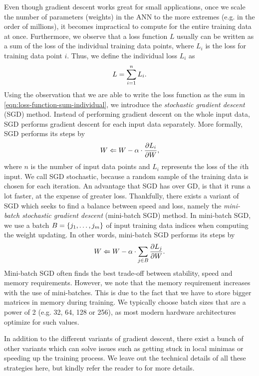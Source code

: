 Even though gradient descent works great for small applications, once we scale the number of parameters (weights) in the ANN to the more extremes (e.g. in the order of millions), it becomes impractical to compute for the entire training data at once. Furthermore, we observe that a loss function $L$ usually can be written as a sum of the loss of the individual training data points, where $L_i$ is the loss for training data point $i$. Thus, we define the individual loss $L_i$ as
\begin{align}
    \label{eqn:loss-function-sum-individual}
    L = \sum\limits_{i=1}^{n} L_i.
\end{align}
Using the observation that we are able to write the loss function as the sum in \cref{eqn:loss-function-sum-individual}, we introduce the \textit{stochastic gradient descent} (SGD) method. Instead of performing gradient descent on the whole input data, SGD performs gradient descent for each input data separately. More formally, SGD performs its steps by
\begin{align}
    \label{eqn:sgd}
    W \Leftarrow W - \alpha \cdot \frac{\partial L_i}{\partial W},
\end{align}
where $n$ is the number of input data points and $L_i$ represents the loss of the $i$th input. We call SGD stochastic, because a random sample of the training data is chosen for each iteration. An advantage that SGD has over GD, is that it runs a lot faster, at the expense of greater loss. Thankfully, there exists a variant of SGD which seeks to find a balance between speed and loss, namely the \textit{mini-batch stochastic gradient descent} (mini-batch SGD) method. In mini-batch SGD, we use a batch $B=\left\{j_1, \ldots, j_m\right\}$ of input training data indices when computing the weight updating. In other words, mini-batch SGD performs its steps by
\begin{align}
    \label{eqn:mbsgd}
    W \Leftarrow W - \alpha \cdot \sum\limits_{j \in B}^{} \frac{\partial L_j}{\partial W}.
\end{align}
Mini-batch SGD often finds the best trade-off between stability, speed and memory requirements. However, we note that the memory requirement increases with the use of mini-batches. This is due to the fact that we have to store bigger matrices in memory during training. We typically choose batch sizes that are a power of 2 (e.g. 32, 64, 128 or 256), as most modern hardware architectures optimize for such values.

In addition to the different variants of gradient descent, there exist a bunch of other variants which can solve issues such as getting stuck in local minimas or speeding up the training process. We leave out the technical details of all these strategies here, but kindly refer the reader to \cite[Chapter 3.5]{Aggarwal18} for more details.

